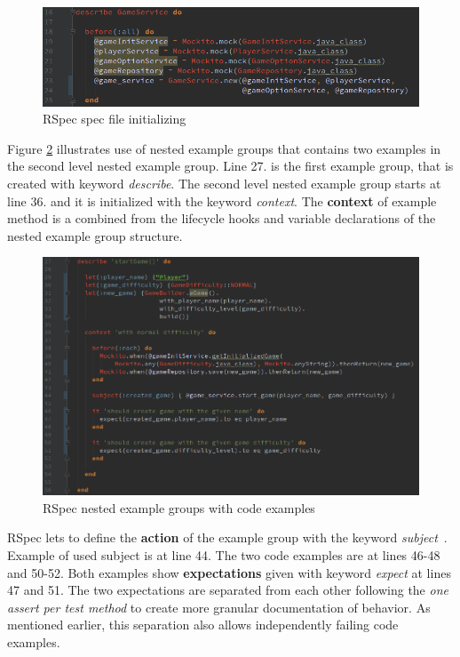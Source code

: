     \begin{figure}[H]
      \begin{center}
        \includegraphics[width=13.7cm]{images/rspec-init.png}
        \caption{RSpec spec file initializing}
        \label{fig:rspec-init}
      \end{center}
    \end{figure}
    \restoregeometry
    Figure \ref{fig:rspec-example} illustrates use of nested example groups that contains two examples in the second
    level nested example group. Line 27. is the first example group, that is created with keyword \textit{describe}. The second
    level nested example group starts at line 36. and it is initialized with the keyword \textit{context}. The \textbf{context} of
    example method is a combined from the lifecycle hooks and variable declarations of the nested example group structure.

    \begin{figure}[ht]
      \begin{center}
        \includegraphics[width=13.7cm]{images/rspec-example.png}
        \caption{RSpec nested example groups with code examples}
        \label{fig:rspec-example}
      \end{center}
    \end{figure}

    RSpec lets to define the \textbf{action} of the example group with the keyword \textit{subject}~\cite{rspec-subject}. Example of used subject is at
    line 44. The two code examples are at lines 46-48 and 50-52.  Both examples show \textbf{expectations} given with keyword \textit{expect}
    at lines 47 and 51. The two expectations are separated from each other following the \textit{one assert per test method}
    to create more granular documentation of behavior. As mentioned earlier, this separation also allows independently failing code examples.

